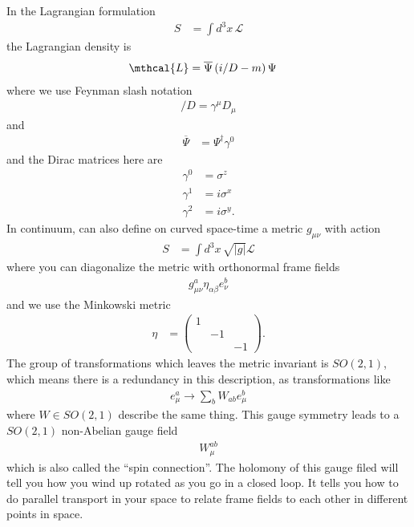 In the Lagrangian formulation
\begin{align}
    S &= \int d^3x\, \mathcal{L}
\end{align}
the Lagrangian density is
\begin{align}
    \mthcal{L} &=
    \overline{\Psi} \left( i \slash{D} - m \right) \Psi
\end{align}
where we use Feynman slash notation
\begin{align}
    \slash{D} = \gamma^{\mu}D_{\mu}
\end{align}
and
\begin{align}
    \overline{\Psi} &= \Psi^\dagger \gamma^0
\end{align}
and the Dirac matrices here are
\begin{align}
    \gamma^0 &= \sigma^z\\
    \gamma^1 &= i \sigma^x\\
    \gamma^2 &= i\sigma^y.
\end{align}
In continuum,
can also define on curved space-time a metric $g_{\mu\nu}$
with action
\begin{align}
    S &= \int d^3x\,
    \sqrt{|g|} \mathcal{L}
\end{align}
where you can diagonalize the metric with orthonormal frame fields
\begin{align}
    g_{\mu\nu}^a \eta_{\alpha\beta} e_{\nu}^b
\end{align}
and we use the Minkowski metric
\begin{align}
    \eta &=
    \begin{pmatrix}
        1 & &\\
        & -1 &\\
        & & -1
    \end{pmatrix}.
\end{align}
The group of transformations which leaves the metric invariant is
$SO(2, 1)$, which means there is a redundancy in this description,
as transformations like
\begin{align}
    e_{\mu}^a \to \sum_{b} W_{ab} e_\mu^b
\end{align}
where $W\in SO(2,1)$ describe the same thing.
This gauge symmetry leads to a $SO(2, 1)$
non-Abelian gauge field
\begin{align}
    W_\mu^{ab}
\end{align}
which is also called the ``spin connection''.
The holomony of this gauge filed will tell you how you wind up rotated as you go
in a closed loop.
It tells you how to do parallel transport in your space to relate frame fields to
each other in different points in space.

